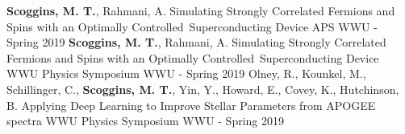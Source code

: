 

\begin{cventries}
\cventry
    {\textbf{Scoggins, M. T.}, Rahmani, A.}
    {Simulating Strongly Correlated Fermions and Spins with an Optimally Controlled Superconducting Device}
    {APS}
    {WWU - Spring 2019}{}{}
    \vspace{-0.2cm}
\cventry
    {\textbf{Scoggins, M. T.}, Rahmani, A.}
    {Simulating Strongly Correlated Fermions and Spins with an Optimally Controlled Superconducting Device}
    {WWU Physics Symposium}
    {WWU - Spring 2019}{}{}
    \vspace{-0.2cm}
\cventry
    {Olney, R., Kounkel, M., Schillinger, C., \textbf{Scoggins, M. T.}, Yin, Y., Howard, E., Covey, K., Hutchinson, B.}
    {Applying Deep Learning to Improve Stellar Parameters from APOGEE spectra}
    {WWU Physics Symposium}
    {WWU - Spring 2019}{}{}
    \vspace{-0.2cm}
\end{cventries}
